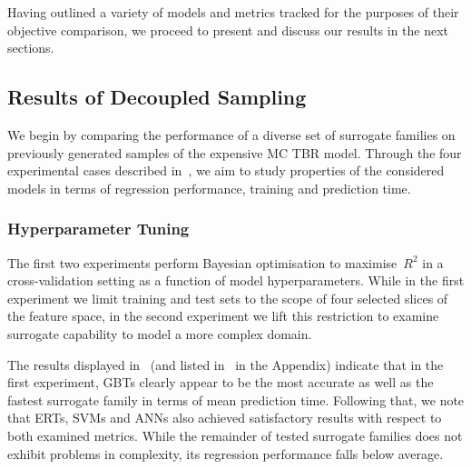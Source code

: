 
Having outlined a variety of models and metrics tracked for the
purposes of their objective comparison, we proceed to present and discuss our
results in the next sections.


\subsection{Results of Decoupled Sampling}
\label{sec:modelres}

We begin by comparing the performance of a diverse set of surrogate families on previously generated samples of the expensive MC TBR model.
Through the four experimental cases described
in~, we aim to study properties of the
considered models in terms of regression performance, training and prediction
time.


\subsubsection{Hyperparameter Tuning}

The first two experiments perform Bayesian optimisation to maximise~$R^2$ in
a cross-validation setting as a function of model hyperparameters. While in the
first experiment we limit training and test sets to the scope of four selected
slices of the feature space, in the second experiment we lift this restriction
to examine surrogate capability to model a more complex domain.

The results displayed in~ (and listed
in~ in the Appendix) indicate that in the first
experiment, GBTs clearly appear to be the most accurate as
well as the fastest surrogate family in terms of mean prediction time. Following
that, we note that ERTs, SVMs and ANNs also achieved satisfactory results with respect to both examined metrics.
While the remainder of tested surrogate families does not exhibit problems in
complexity, its regression performance falls below average.

